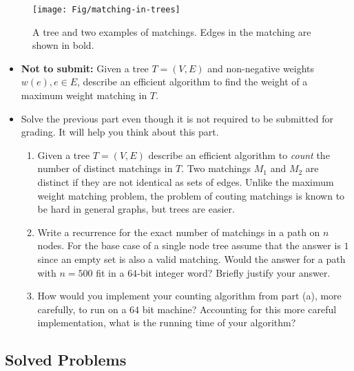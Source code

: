 \documentclass[11pt]{article}
\begin{document}
\begin{enumerate}
  \begin{figure}[h]
    \centering
    \texttt{[image: Fig/matching-in-trees]}
    \caption{A tree and two examples of matchings. Edges in the matching
      are shown in bold.}
    \label{fig:matching}
  \end{figure}
  \begin{itemize}
  \item {\bf Not to submit:} Given a tree $T=(V,E)$ and non-negative
    weights $w(e), e \in E$, describe an efficient algorithm to find
    the weight of a maximum weight matching in $T$.
  \item Solve the previous part even though it is not required to be
    submitted for grading. It will help you think about this part.
    \begin{enumerate}
    \item Given a tree $T=(V,E)$ describe an efficient algorithm to
      \emph{count} the number of distinct matchings in $T$. Two matchings
      $M_1$ and $M_2$ are distinct if they are not identical as sets of edges.
      Unlike the maximum weight matching problem, the problem of couting
      matchings is known to be hard in general graphs, but trees are
      easier. 
    \item Write a recurrence for the exact number of matchings in a
      path on $n$ nodes. For the base case of a single node tree
      assume that the answer is $1$ since an empty set is also a valid
      matching. Would the answer for a path with $n=500$ fit in a
      $64$-bit integer word? Briefly justify your answer.
    \item How would you implement your counting algorithm from part
      (a), more carefully, to run on a $64$ bit machine?  Accounting
      for this more careful implementation, what is the running time of
      your algorithm? 
    \end{enumerate}
  \end{itemize}

  

\end{enumerate}
\vspace{1in}

\subsection*{Solved Problems}


\def\LL{\texttt{\textbf{{\color{Green} (\!\!\!\!(}}}}
\def\RR{\texttt{\textbf{{\color{Green} )\!\!\!\!)}}}}
\def\LLL{\texttt{\textbf{{\color{Red} [\!\!\!\![}}}}
\def\RRR{\texttt{\textbf{{\color{Red} ]\!\!\!\!]}}}}
\end{document}
